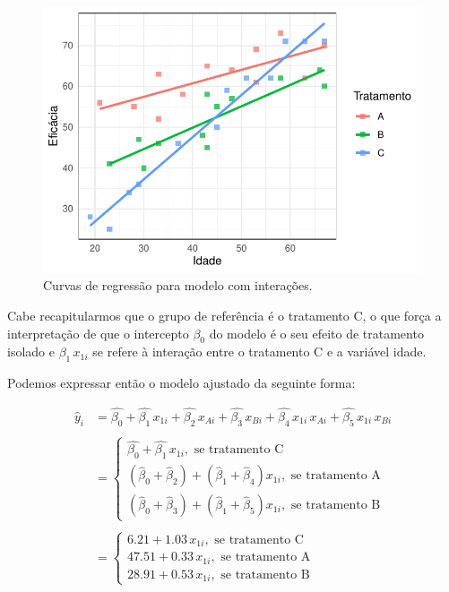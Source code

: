 \documentclass[
  letterpaper,
  DIV=11,
  numbers=noendperiod]{scrartcl}
\begin{document}
\begin{figure}

{\centering \includegraphics{lista2_files/figure-pdf/unnamed-chunk-20-1.pdf}

}

\caption{Curvas de regressão para modelo com interações.}

\end{figure}

Cabe recapitularmos que o grupo de referência é o tratamento C, o que
força a interpretação de que o intercepto \(\beta_0\) do modelo é o seu
efeito de tratamento isolado e \(\beta_1 \, x_{1i}\) se refere à
interação entre o tratamento C e a variável idade.

Podemos expressar então o modelo ajustado da seguinte forma:

\begin{align}
   \hat{y}_i &= \hat{\beta_0} + \hat{\beta_1} \, x_{1i} + \hat{\beta_2} \, x_{Ai} + \hat{\beta_3} \, x_{Bi} + \hat{\beta_4} \, x_{1i} \, x_{Ai} +\hat{\beta_5} \, x_{1i} \, x_{Bi} \nonumber \\
   \nonumber \\
   &= \begin{cases}
        \hat{\beta_0} + \hat{\beta_1} \, x_{1i}, \text{ se tratamento C} \\
        (\hat{\beta}_0 + \hat{\beta}_2) + (\hat{\beta}_1 + \hat{\beta}_4) x_{1i},  \text{ se tratamento A} \\
        (\hat{\beta}_0 + \hat{\beta}_3) + (\hat{\beta}_1 + \hat{\beta}_5) x_{1i},  \text{ se tratamento B}
      \end{cases} \nonumber \\
      \nonumber \\
  &= \begin{cases}
        6.21 + 1.03 \, x_{1i}, \text{ se tratamento C} \\
        47.51 + 0.33 \,  x_{1i},  \text{ se tratamento A} \\
        28.91 + 0.53 \,  x_{1i},  \text{ se tratamento B}
  \end{cases}\label{modelo_decomposto}
\end{align}
\end{document}
